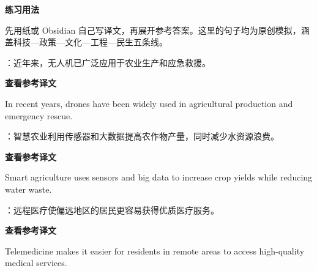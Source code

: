 \documentclass[a4paper,11pt,UTF8,fontset=none]{ctexart}
\begin{document}
\begin{tcolorbox}[enhanced,breakable,boxrule=0.35pt,colback=VeryPaleBlue,colframe=AccentBlue!40,left=7pt,right=7pt,top=4pt,bottom=4pt,borderline west={2pt}{0pt}{AccentBlue},before skip=4pt,after skip=6pt]
{\bfseries\color{AccentBlue} 练习用法}\par\vspace{1pt}
\noindent 先用纸或 Obsidian 自己写译文，再展开参考答案。这里的句子均为原创模拟，涵盖科技—政策—文化—工程—民生五条线。\par


\end{tcolorbox}

：近年来，无人机已广泛应用于农业生产和应急救援。\par

\noindent\colorbox{HeadBlue}{\strut {\bfseries 查看参考译文}}\par\vspace{1pt}

\noindent In recent years, drones have been widely used in agricultural production and emergency rescue.\par

\vspace{4pt}

：智慧农业利用传感器和大数据提高农作物产量，同时减少水资源浪费。\par

\noindent\colorbox{HeadBlue}{\strut {\bfseries 查看参考译文}}\par\vspace{1pt}

\noindent Smart agriculture uses sensors and big data to increase crop yields while reducing water waste.\par

\vspace{4pt}

：远程医疗使偏远地区的居民更容易获得优质医疗服务。\par

\noindent\colorbox{HeadBlue}{\strut {\bfseries 查看参考译文}}\par\vspace{1pt}

\noindent Telemedicine makes it easier for residents in remote areas to access high-quality medical services.\par
\end{document}
